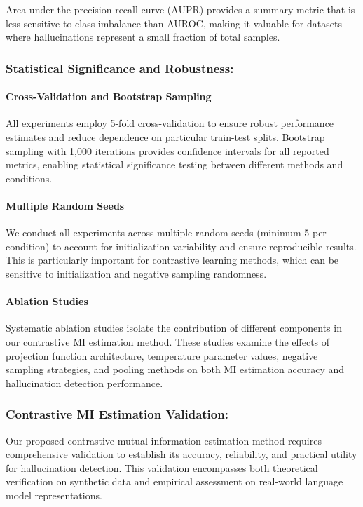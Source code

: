 Area under the precision-recall curve (AUPR) provides a summary metric that is less sensitive to class imbalance than AUROC, making it valuable for datasets where hallucinations represent a small fraction of total samples.

\subsubsection{Statistical Significance and Robustness:}

\paragraph{Cross-Validation and Bootstrap Sampling}
All experiments employ 5-fold cross-validation to ensure robust performance estimates and reduce dependence on particular train-test splits. Bootstrap sampling with 1,000 iterations provides confidence intervals for all reported metrics, enabling statistical significance testing between different methods and conditions.

\paragraph{Multiple Random Seeds}
We conduct all experiments across multiple random seeds (minimum 5 per condition) to account for initialization variability and ensure reproducible results. This is particularly important for contrastive learning methods, which can be sensitive to initialization and negative sampling randomness.

\paragraph{Ablation Studies}
Systematic ablation studies isolate the contribution of different components in our contrastive MI estimation method. These studies examine the effects of projection function architecture, temperature parameter values, negative sampling strategies, and pooling methods on both MI estimation accuracy and hallucination detection performance.

\subsubsection{Contrastive MI Estimation Validation:}

Our proposed contrastive mutual information estimation method requires comprehensive validation to establish its accuracy, reliability, and practical utility for hallucination detection. This validation encompasses both theoretical verification on synthetic data and empirical assessment on real-world language model representations.

